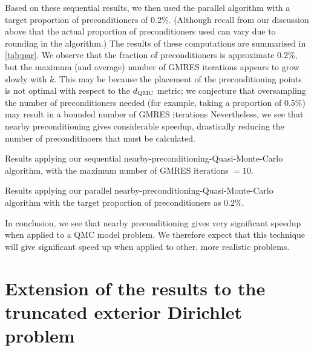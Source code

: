     Based on these sequential results, we then used the parallel algorithm with a target proportion of preconditioners of 0.2\%. (Although recall from our discussion above that the actual proportion of preconditioners used can vary due to rounding in the algorithm.) The results of these computations are summarised in \cref{tab:par}. We observe that the fraction of preconditioners is approximate 0.2\%, but the maximum (and average) number of GMRES iterations appears to grow slowly with $k.$ This may be because the placement of the preconditioning points is not optimal with respect to the $d_{\mathrm{QMC}}$ metric; we conjecture that oversampling the number of preconditioners needed (for example, taking a proportion of 0.5\%) may result in a bounded number of GMRES iterations Nevertheless, we see that nearby preconditioning gives considerable speedup, drastically reducing the number of preconditinoers that must be calculated.

    \begin{table}
  \centering
  
  \caption{Results applying our sequential nearby-preconditioning-Quasi-Monte-Carlo algorithm, with the maximum number of GMRES iterations $=10$.}\label{tab:nbpcqmcseq}
\end{table}

\begin{table}
  \centering
  
  \caption{Results applying our parallel nearby-preconditioning-Quasi-Monte-Carlo algorithm with the target proportion of preconditioners as $0.2$\%.}\label{tab:nbpcqmcspar}
  \end{table}


    In conclusion, we see that nearby preconditioning gives very significant speedup when applied to a QMC model problem. We therefore expect that this technique will give significant speed up when applied to other, more realistic problems.
    

    
\section{Extension of the results to the truncated exterior Dirichlet problem}\label{sec:TEDP}


